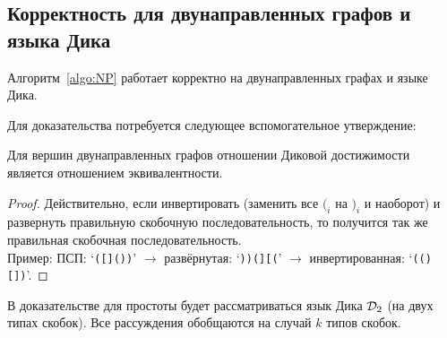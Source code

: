 \subsection{Корректность для двунаправленных графов и языка Дика}

\begin{theorem}\label{th:bidir_corr}
  Алгоритм~\ref{algo:NP} работает корректно на двунаправленных графах и языке Дика.
\end{theorem}


Для доказательства потребуется следующее вспомогательное утверждение:

\begin{lemma}\label{lemma:bidir_equiv}
  Для вершин двунаправленных графов отношении Диковой достижимости является отношением эквивалентности.
\end{lemma}
\begin{proof}

  Действительно, если инвертировать (заменить все $(_i$ на $)_i$ и наоборот) и развернуть правильную скобочную последовательность, то получится так же правильная скобочная последовательность.\\
  Пример: ПСП: `\texttt{([]())}' $\to$ развёрнутая: `\texttt{))(][(}' $\to$ инвертированная: `\texttt{(()[])}'.

\end{proof}

\begin{note}
  В доказательстве для простоты будет рассматриваться язык Дика $\mathcal{D}_2$ (на двух типах скобок). Все рассуждения обобщаются на случай $k$ типов скобок.
\end{note}

